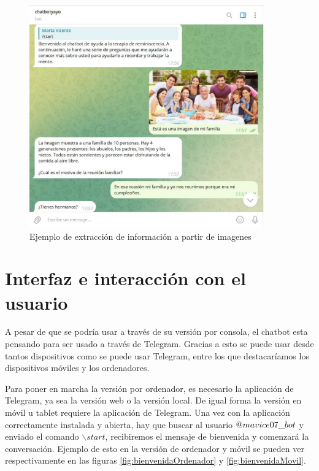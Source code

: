 \begin{figure}[h]
	\centering
	\includegraphics[width=0.9\textwidth]{Imagenes/extracInfoImag}
	\caption{Ejemplo de extracción de información a partir de imagenes}
	\label{fig:imagenFamilia}
\end{figure}

\section{Interfaz e interacción con el usuario}
A pesar de que se podría usar a través de su versión por consola, el chatbot esta pensando para ser usado a través de Telegram. Gracias a esto se puede usar desde tantos dispositivos como se puede usar Telegram, entre los que destacaríamos los dispositivos móviles y los ordenadores.

Para poner en marcha la versión por ordenador, es necesario la aplicación de Telegram, ya sea la versión web o la versión local. De igual forma la versión en móvil u tablet requiere la aplicación de Telegram. Una vez con la aplicación correctamente instalada y abierta, hay que buscar al usuario $\makeatletter @ mavice07\_bot$ y enviado el comando  $\backslash start$, recibiremos el mensaje de bienvenida y comenzará la conversación. Ejemplo de esto en la versión de ordenador y móvil se pueden ver respectivamente en las figuras \ref{fig:bienvenidaOrdenador} y \ref{fig:bienvenidaMovil}.

